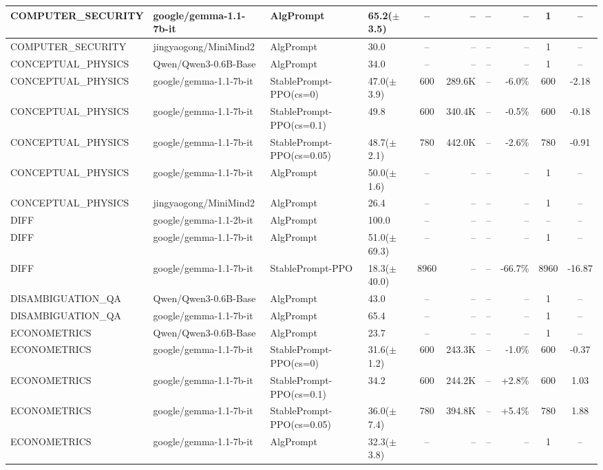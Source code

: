 {\begin{longtable}{@{}p{5.5cm}p{4.5cm}p{2.5cm}lcrrrcc@{}}
COMPUTER\_SECURITY & google/gemma-1.1-7b-it & AlgPrompt & 65.2($\pm$3.5) & -- & -- & -- & -- & 1 & -- \\
\midrule
COMPUTER\_SECURITY & jingyaogong/MiniMind2 & AlgPrompt & 30.0 & -- & -- & -- & -- & 1 & -- \\
\midrule
CONCEPTUAL\_PHYSICS & Qwen/Qwen3-0.6B-Base & AlgPrompt & 34.0 & -- & -- & -- & -- & 1 & -- \\
\midrule
CONCEPTUAL\_PHYSICS & google/gemma-1.1-7b-it & StablePrompt-PPO(cs=0) & 47.0($\pm$3.9) & 600 & 289.6K & -- & -6.0\% & 600 & -2.18 \\
CONCEPTUAL\_PHYSICS & google/gemma-1.1-7b-it & StablePrompt-PPO(cs=0.1) & 49.8 & 600 & 340.4K & -- & -0.5\% & 600 & -0.18 \\
CONCEPTUAL\_PHYSICS & google/gemma-1.1-7b-it & StablePrompt-PPO(cs=0.05) & 48.7($\pm$2.1) & 780 & 442.0K & -- & -2.6\% & 780 & -0.91 \\
CONCEPTUAL\_PHYSICS & google/gemma-1.1-7b-it & AlgPrompt & 50.0($\pm$1.6) & -- & -- & -- & -- & 1 & -- \\
\midrule
CONCEPTUAL\_PHYSICS & jingyaogong/MiniMind2 & AlgPrompt & 26.4 & -- & -- & -- & -- & 1 & -- \\
\midrule
DIFF & google/gemma-1.1-2b-it & AlgPrompt & 100.0 & -- & -- & -- & -- & -- & -- \\
\midrule
DIFF & google/gemma-1.1-7b-it & AlgPrompt & 51.0($\pm$69.3) & -- & -- & -- & -- & 1 & -- \\
DIFF & google/gemma-1.1-7b-it & StablePrompt-PPO & 18.3($\pm$40.0) & 8960 & -- & -- & -66.7\% & 8960 & -16.87 \\
\midrule
DISAMBIGUATION\_QA & Qwen/Qwen3-0.6B-Base & AlgPrompt & 43.0 & -- & -- & -- & -- & 1 & -- \\
\midrule
DISAMBIGUATION\_QA & google/gemma-1.1-7b-it & AlgPrompt & 65.4 & -- & -- & -- & -- & 1 & -- \\
\midrule
ECONOMETRICS & Qwen/Qwen3-0.6B-Base & AlgPrompt & 23.7 & -- & -- & -- & -- & 1 & -- \\
\midrule
ECONOMETRICS & google/gemma-1.1-7b-it & StablePrompt-PPO(cs=0) & 31.6($\pm$1.2) & 600 & 243.3K & -- & -1.0\% & 600 & -0.37 \\
ECONOMETRICS & google/gemma-1.1-7b-it & StablePrompt-PPO(cs=0.1) & 34.2 & 600 & 244.2K & -- & +2.8\% & 600 & 1.03 \\
ECONOMETRICS & google/gemma-1.1-7b-it & StablePrompt-PPO(cs=0.05) & 36.0($\pm$7.4) & 780 & 394.8K & -- & +5.4\% & 780 & 1.88 \\
ECONOMETRICS & google/gemma-1.1-7b-it & AlgPrompt & 32.3($\pm$3.8) & -- & -- & -- & -- & 1 & -- \\

\end{longtable}}
